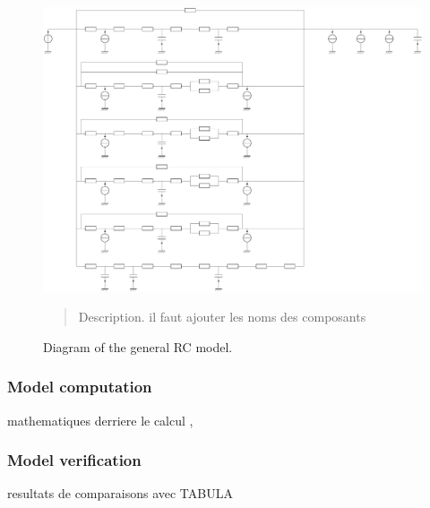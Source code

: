 \documentclass[11pt]{article}
\begin{document}
        \begin{figure}[ht]
            \centering
            \includegraphics[width=0.99\columnwidth]{figures/RC_genmod_unlabeled.pdf}
            \caption{\label{fig:rc_mod} Diagram of the general RC model.}
            \begin{quote}
                \vspace{-2mm}
                \small\noindent
                Description. il faut ajouter les noms des composants 
              \end{quote}
        \end{figure}  
        

        \subsubsection{Model computation} %
        \label{ssub:model_computation}
        
        mathematiques derriere le calcul
        \cite{madsen_estimation_1995}, \cite{rouchier_solving_2018}

        

        \subsubsection{Model verification} %
        \label{ssub:model_verification}
        
        resultats de comparaisons avec TABULA 
\end{document}
